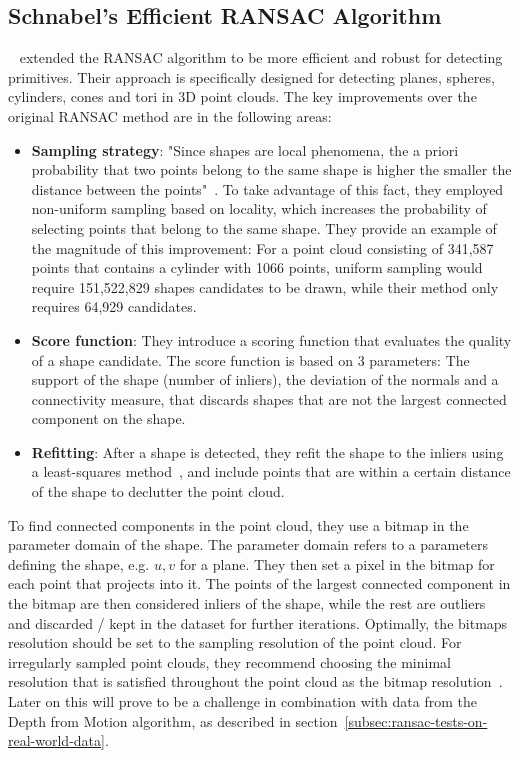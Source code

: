 \subsection{Schnabel's Efficient RANSAC Algorithm}\label{subsec:schnabels-efficient-ransac-algorithm}
\citeauthor{schnabel_efficient_2007}~\cite{schnabel_efficient_2007} extended the RANSAC algorithm to be more efficient
and robust for detecting primitives.
Their approach is specifically designed for detecting planes, spheres, cylinders, cones and tori in 3D point clouds.
The key improvements over the original RANSAC method are in the following areas:
\begin{itemize}
    \item \textbf{Sampling strategy}: "Since shapes are local phenomena, the a priori probability that two points belong to the same shape is higher the smaller the distance between the points"~\parencite{schnabel_efficient_2007}.
    To take advantage of this fact, they employed non-uniform sampling based on locality, which increases the probability of selecting points that belong to the same shape.
    They provide an example of the magnitude of this improvement: For a point cloud consisting of 341,587 points that contains a cylinder with 1066 points, uniform sampling would require 151,522,829 shapes candidates to be drawn, while their method only requires 64,929 candidates.
    \item \textbf{Score function}: They introduce a scoring function that evaluates the quality of a shape candidate.
    The score function is based on 3 parameters: The support of the shape (number of inliers), the deviation of the normals and a connectivity measure, that discards shapes that are not the largest connected component on the shape.
    \item \textbf{Refitting}: After a shape is detected, they refit the shape to the inliers using a least-squares method~\cite{shakarji_least-squares_1998}, and include points that are within a certain distance of the shape to declutter the point cloud.
\end{itemize}

To find connected components in the point cloud, they use a bitmap in the parameter domain of the shape.
The parameter domain refers to a parameters defining the shape, e.g. $u, v$ for a plane.
They then set a pixel in the bitmap for each point that projects into it.
The points of the largest connected component in the bitmap are then considered inliers of the shape,
while the rest are outliers and discarded / kept in the dataset for further iterations.
Optimally, the bitmaps resolution should be set to the sampling resolution of the point cloud.
For irregularly sampled point clouds, they recommend choosing the minimal resolution that is satisfied throughout the point cloud as the bitmap resolution~\cite{schnabel_efficient_2007}.
Later on this will prove to be a challenge in combination with data from the Depth from Motion algorithm, as described in section~\ref{subsec:ransac-tests-on-real-world-data}.

